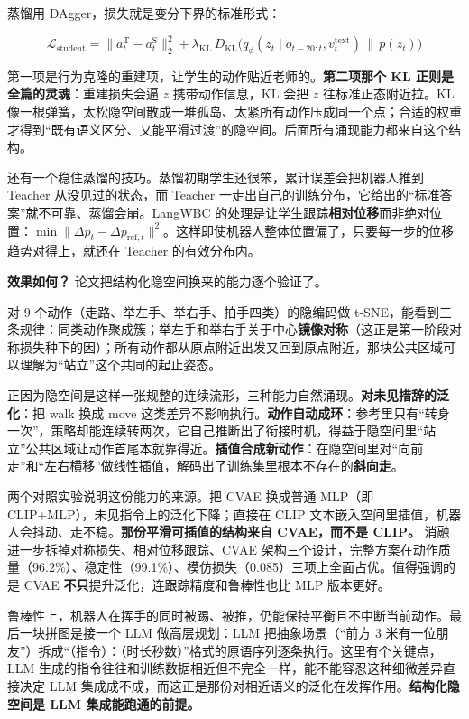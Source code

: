 \documentclass[
  chinese,
]{ctexart}
\begin{document}
蒸馏用 DAgger，损失就是变分下界的标准形式：

\[\mathcal{L}_{\text{student}} = \|a^{\text{T}}_t - a^{\text{S}}_t\|_2^2 + \lambda_{\text{KL}}\, D_{\text{KL}}\big(q_{\phi}(z_t \mid o_{t-20:t}, v_t^{\text{text}}) \,\|\, p(z_t)\big)\]

第一项是行为克隆的重建项，让学生的动作贴近老师的。\textbf{第二项那个 KL
正则是全篇的灵魂}：重建损失会逼 \(z\) 携带动作信息，KL 会把 \(z\)
往标准正态附近拉。KL
像一根弹簧，太松隐空间散成一堆孤岛、太紧所有动作压成同一个点；合适的权重才得到``既有语义区分、又能平滑过渡''的隐空间。后面所有涌现能力都来自这个结构。

还有一个稳住蒸馏的技巧。蒸馏初期学生还很笨，累计误差会把机器人推到
Teacher 从没见过的状态，而 Teacher
一走出自己的训练分布，它给出的``标准答案''就不可靠、蒸馏会崩。LangWBC
的处理是让学生跟踪\textbf{相对位移}而非绝对位置：\(\min \|\Delta p_t - \Delta p_{\text{ref}, t}\|^2\)。这样即使机器人整体位置偏了，只要每一步的位移趋势对得上，就还在
Teacher 的有效分布内。

\textbf{效果如何？} 论文把结构化隐空间换来的能力逐个验证了。

对 9 个动作（走路、举左手、举右手、拍手四类）的隐编码做
t-SNE，能看到三条规律：同类动作聚成簇；举左手和举右手关于中心\textbf{镜像对称}（这正是第一阶段对称损失种下的因）；所有动作都从原点附近出发又回到原点附近，那块公共区域可以理解为``站立''这个共同的起止姿态。

正因为隐空间是这样一张规整的连续流形，三种能力自然涌现。\textbf{对未见措辞的泛化}：把
walk 换成 move
这类差异不影响执行。\textbf{动作自动成环}：参考里只有``转身一次''，策略却能连续转两次，它自己推断出了衔接时机，得益于隐空间里``站立''公共区域让动作首尾本就靠得近。\textbf{插值合成新动作}：在隐空间里对``向前走''和``左右横移''做线性插值，解码出了训练集里根本不存在的\textbf{斜向走}。

两个对照实验说明这份能力的来源。把 CVAE 换成普通 MLP（即
CLIP+MLP），未见指令上的泛化下降；直接在 CLIP
文本嵌入空间里插值，机器人会抖动、走不稳。\textbf{那份平滑可插值的结构来自
CVAE，而不是 CLIP。} 消融进一步拆掉对称损失、相对位移跟踪、CVAE
架构三个设计，完整方案在动作质量（96.2\%）、稳定性（99.1\%）、模仿损失（0.085）三项上全面占优。值得强调的是
CVAE \textbf{不只}提升泛化，连跟踪精度和鲁棒性也比 MLP 版本更好。

鲁棒性上，机器人在挥手的同时被踢、被推，仍能保持平衡且不中断当前动作。最后一块拼图是接一个
LLM 做高层规划：LLM 把抽象场景（``前方 3
米有一位朋友''）拆成``（指令）：（时长秒数）''格式的原语序列逐条执行。这里有个关键点，LLM
生成的指令往往和训练数据相近但不完全一样，能不能容忍这种细微差异直接决定
LLM
集成成不成，而这正是那份对相近语义的泛化在发挥作用。\textbf{结构化隐空间是
LLM 集成能跑通的前提。}
\end{document}
